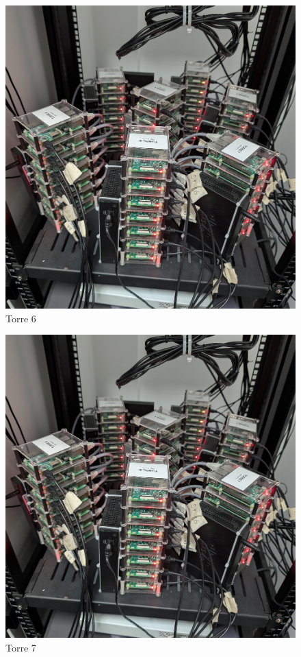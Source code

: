 \hbox{}
\hbox{}
\hbox{}
\hbox{}


\begin{figure}[H]
	\centering
	\includegraphics[scale=0.07]{tablas-images/raspberries/torre-06.jpg}
	\caption{Torre 6}
\end{figure}




\begin{figure}[H]
	\centering
	\includegraphics[scale=0.07]{tablas-images/raspberries/torre-07.jpg}
	\caption{Torre 7}
\end{figure}

